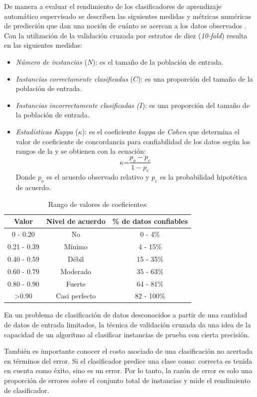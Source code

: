 \label{ssec6:metricas}De manera a evaluar el rendimiento de los clasificadores
de aprendizaje automático supervisado se describen las siguientes
medidas y métricas numéricas de predicción que dan una noción de cuánto
se acercan a los datos observados \cite{Witten2017}. Con la utilización
de la validación cruzada por estratos de diez (\emph{10-fold}) resulta
en las siguientes medidas:
\begin{itemize}
\item \emph{Número de instancias} ($N$): es el tamaño de la población de
entrada.
\item \emph{Instancias correctamente clasificadas} ($C$): es una proporción
del tamaño de la población de entrada.
\item \emph{Instancias incorrectamente clasificadas} \emph{(}$I$): es una
proporción del tamaño de la población de entrada.
\item \emph{Estadísticas Kappa} ($\kappa$): es el coeficiente \emph{kappa}
de \emph{Cohen} que determina el valor de coeficiente de concordancia
para confiabilidad de los datos según los rangos de la 
y se obtienen con la ecuación: 
\[
\kappa\text{=}\frac{p_{o}-p_{e}}{1-p_{e}}
\]
Donde $p_{o}$ es el acuerdo observado relativo y $p_{e}$ es la probabilidad
hipotética de acuerdo.
\end{itemize}
\begin{table}[h]
\begin{centering}
\begin{tabular}{|c|c|c|}
\hline 
Valor & Nivel de acuerdo & \% de datos confiables\tabularnewline
\hline 
\hline 
0 - 0.20 & No & 0 - 4\%\tabularnewline
\hline 
0.21 - 0.39 & Mínimo & 4 - 15\%\tabularnewline
\hline 
0.40 - 0.59 & Débil & 15 - 35\%\tabularnewline
\hline 
0.60 - 0.79 & Moderado & 35 - 63\%\tabularnewline
\hline 
0.80 - 0.90 & Fuerte & 64 - 81\%\tabularnewline
\hline 
\textgreater{}0.90 & Casi perfecto & 82 - 100\%\tabularnewline
\hline 
\end{tabular}
\par\end{centering}
\caption{\label{tab6:kappa-coef}Rango de valores de coeficiente$\kappa$}
\end{table}

En un problema de clasificación de datos desconocidos a partir de
una cantidad de datos de entrada limitados, la técnica de validación
cruzada da una idea de la capacidad de un algoritmo al clasificar
instancias de prueba con cierta precisión. 

También es importante conocer el costo asociado de una clasificación
no acertada en términos del error. Si el clasificador predice una
clase como: correcta es tenida en cuenta como éxito, sino es un error.
Por lo tanto, la razón de error es solo una proporción de errores
sobre el conjunto total de instancias y mide el rendimiento de clasificador. 

